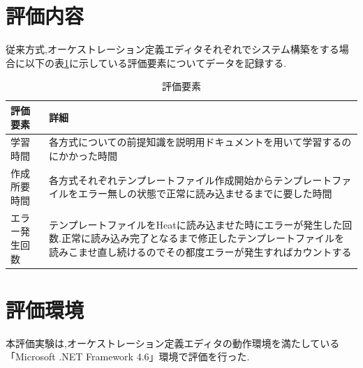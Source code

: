 \documentclass[mingoth]{kut-paper}		%
\begin{document}
	\section{評価内容}
	従来方式,オーケストレーション定義エディタそれぞれでシステム構築をする場合に以下の表\ref{table:5}に示している評価要素についてデータを記録する.
	\begin{table}[H]
		\begin{center}
			\caption{評価要素}
			\label{table:5}
			\begin{tabular}{|p{5cm}|p{7cm}|}\hline
				評価要素 & 詳細\\ \hline \hline
				学習時間 & 各方式についての前提知識を説明用ドキュメントを用いて学習するのにかかった時間\\ \hline
				作成所要時間 & 各方式それぞれテンプレートファイル作成開始からテンプレートファイルをエラー無しの状態で正常に読み込ませるまでに要した時間\\ \hline
				エラー発生回数 & テンプレートファイルをHeatに読み込ませた時にエラーが発生した回数.正常に読み込み完了となるまで修正したテンプレートファイルを読みこませ直し続けるのでその都度エラーが発生すればカウントする\\ \hline
			\end{tabular}
		\end{center}
	\end{table}
	\section{評価環境}
	本評価実験は,オーケストレーション定義エディタの動作環境を満たしている「Microsoft .NET Framework 4.6」環境で評価を行った.
	
\end{document}
